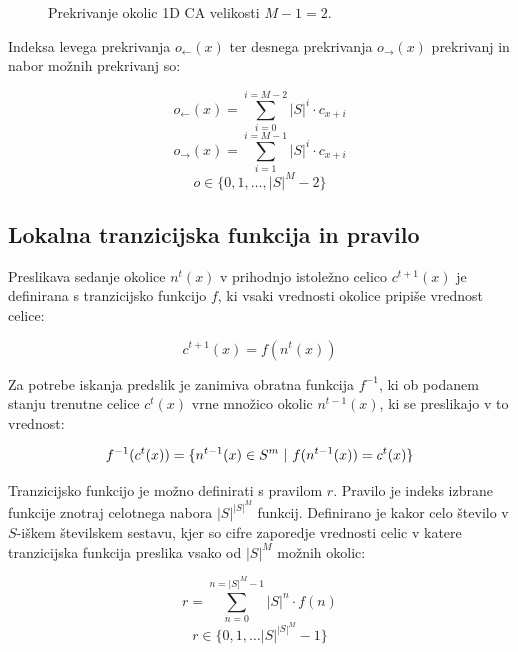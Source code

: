 \documentclass[12pt,a4paper,openany,twoside]{book}
\begin{document}
\begin{figure}[htb]
\centerline{}
\caption[Prekrivanje okolic 1D CA.]{Prekrivanje okolic 1D CA velikosti \(M-1=2\).}
\label{overlap_1d}
\end{figure}

Indeksa levega prekrivanja \(o_{\leftarrow}(x)\) ter desnega prekrivanja \(o_{\rightarrow}(x)\) prekrivanj in nabor možnih prekrivanj so:

\begin{equation}
o_{\leftarrow}(x) = \sum_{i=0}^{i=M-2} |S|^i \cdot c_{x+i}
\end{equation}
\begin{equation}
o_{\rightarrow}(x) = \sum_{i=1}^{i=M-1} |S|^i \cdot c_{x+i}
\end{equation}
\begin{equation}
o \in \{0, 1, \ldots, |S|^M-2\}
\end{equation}

\subsection{Lokalna tranzicijska funkcija in pravilo}

Preslikava sedanje okolice \(n^{t}(x)\) v prihodnjo istoležno celico \(c^{t+1}(x)\) je definirana
s tranzicijsko funkcijo \(f\), ki vsaki vrednosti okolice pripiše vrednost celice:

\begin{equation}
c^{t+1}(x) = f(n^{t}(x))
\end{equation}

Za potrebe iskanja predslik je zanimiva obratna funkcija \(f^{-1}\), ki ob
podanem stanju trenutne celice \(c^{t}(x)\) vrne množico okolic \(n^{t-1}(x)\),
ki se preslikajo v to vrednost:

\begin{equation}
f^{-1}(c^{t}(x)) = \{ n^{t-1}(x) \in S^m \ \arrowvert \ f(n^{t-1}(x)) = c^{t}(x) \}
\end{equation}

Tranzicijsko funkcijo je možno definirati s pravilom  \(r\).
Pravilo je indeks izbrane funkcije znotraj celotnega nabora \(|S|^{|S|^M}\) funkcij.
Definirano je kakor celo število v \(S\)-iškem številskem sestavu,
kjer so cifre zaporedje vrednosti celic v katere tranzicijska funkcija
preslika vsako od \(|S|^M\) možnih okolic:

\begin{equation}
r = \sum_{n=0}^{n=|S|^M-1} |S|^n \cdot f(n)
\end{equation}
\begin{equation}
r \in \{0, 1, \ldots |S|^{|S|^M}-1\}
\end{equation}
\end{document}
